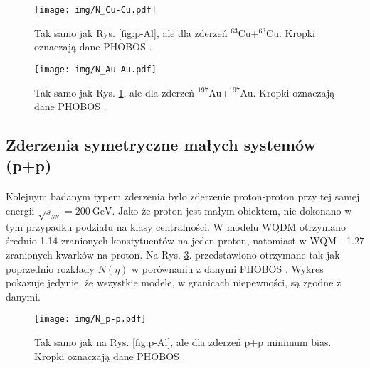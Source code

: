 \documentclass[a4paper,12pt]{article}
\begin{document}
\begin{figure}[H]
\begin{center}
\texttt{[image: img/N\_Cu-Cu.pdf]}
\vspace*{-0.1in}
\caption{Tak samo jak Rys. \ref{fig:p-Al}, ale dla zderzeń $^{63}$Cu+$^{63}$Cu. Kropki oznaczają dane PHOBOS \cite{Alver:2007aa}.}\label{fig:Cu-Cu}
\end{center}
\end{figure}
\vspace*{-0.4in}
\begin{figure}[H]
\begin{center}
\texttt{[image: img/N\_Au-Au.pdf]}
\vspace*{-0.1in}
\caption{Tak samo jak Rys. \ref{fig:Cu-Cu}, ale dla zderzeń $^{197}$Au+$^{197}$Au. Kropki oznaczają dane PHOBOS \cite{Back:2002wb}.}\label{fig:Au-Au}
\end{center}
\end{figure}

\subsection{Zderzenia symetryczne małych systemów (p+p)}
\paragraph{}
Kolejnym badanym typem zderzenia było zderzenie proton-proton przy tej samej energii $\sqrt{s_{_{NN}}} = 200~\text{GeV}$. Jako że proton jest małym obiektem, nie dokonano w tym przypadku podziału na klasy centralności. W modelu WQDM otrzymano średnio 1.14 zranionych konstytuentów na jeden proton, natomiast w WQM - 1.27 zranionych kwarków na proton. Na Rys. \ref{fig:p-p}. przedstawiono otrzymane tak jak poprzednio rozkłady $N(\eta)$ w porównaniu z danymi PHOBOS \cite{Alver:2010ck}. Wykres pokazuje jedynie, że wszystkie modele, w granicach niepewności, są zgodne z danymi.

\begin{figure}[H]
\begin{center}
\texttt{[image: img/N\_p-p.pdf]}
\caption{Tak samo jak na Rys. \ref{fig:p-Al}, ale dla zderzeń p+p minimum bias. Kropki oznaczają dane PHOBOS \cite{Alver:2010ck}.}\label{fig:p-p}
\end{center}
\end{figure}
\end{document}
